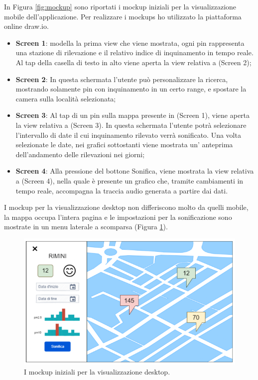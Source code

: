 In Figura \ref{fig:mockup} sono riportati i mockup iniziali per la visualizzazione mobile dell'applicazione.
Per realizzare i mockups ho utilizzato la piattaforma online draw.io.
\begin{itemize}
    \item \textbf{Screen 1}: modella la prima view che viene mostrata, ogni pin rappresenta una stazione di rilevazione e il relativo indice di inquinamento in tempo reale. Al tap della casella di testo in alto viene aperta la view relativa a (Screen 2);
    \item \textbf{Screen 2}: In questa schermata l’utente può personalizzare la ricerca, mostrando solamente pin con inquinamento in un certo range, e spostare la camera sulla località selezionata;
    \item \textbf{Screen 3}: Al tap di un pin sulla mappa presente in (Screen 1), viene aperta la view relativa a (Screen 3). In questa schermata l’utente potrà selezionare l’intervallo di date il cui inquinamento rilevato verrà sonificato. Una volta selezionate le date, nei grafici sottostanti viene mostrata un’ anteprima dell’andamento delle rilevazioni nei giorni;
    \item \textbf{Screen 4}: Alla pressione del bottone Sonifica, viene mostrata la view relativa a (Screen 4), nella quale è presente un grafico che, tramite cambiamenti in tempo reale, accompagna la traccia audio generata a partire dai dati.
\end{itemize}

I mockup per la visualizzazione desktop non differiscono molto da quelli mobile, la mappa occupa l'intera pagina e le impostazioni per la sonificazione sono mostrate in un menu laterale a scomparsa (Figura \ref{fig:desktopmockup}).
\begin{figure}[H]
    \includegraphics[width=\linewidth]{img/desktopmockup.PNG}
    \caption{I mockup iniziali per la visualizzazione desktop.}
    \label{fig:desktopmockup}
\end{figure}




